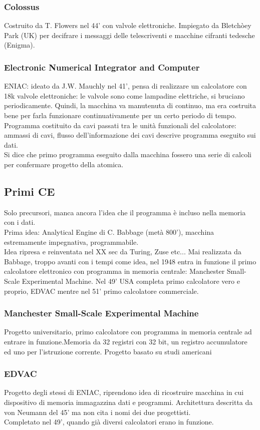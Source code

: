 \documentclass[12pt, oneside]{extbook}
\begin{document}
\subsubsection{Colossus}
Costruito da T. Flowers nel 44' con valvole elettroniche. Impiegato da Bletchòey Park (UK) per decifrare i messaggi delle telescriventi e macchine cifranti tedesche (Enigma).
\subsubsection{Electronic Numerical Integrator and Computer}
ENIAC: ideato da J.W. Mauchly nel 41', pensa di realizzare un calcolatore con 18k valvole elettroniche: le valvole sono come lampadine elettriche, si bruciano periodicamente. Quindi, la macchina va manutenuta di continuo, ma era costruita bene per farla funzionare continuativamente per un certo periodo di tempo. Programma costituito da cavi passati tra le unità funzionali del calcolatore: ammassi di cavi, flusso dell'informazione dei cavi descrive programma eseguito sui dati.\\ Si dice che primo programma eseguito dalla macchina fossero una serie di calcoli per confermare progetto della atomica.
\subsection{Primi CE}
Solo precursori, manca ancora l'idea che il programma è incluso nella memoria con i dati.\\ Prima idea: Analytical Engine di C. Babbage (metà 800'), macchina estremamente impegnativa, programmabile. \\ Idea ripresa e reinventata nel XX sec da Turing, Zuse etc... Mai realizzata da Babbage, troppo avanti con i tempi come idea, nel 1948 entra in funzione il primo calcolatore elettronico con programma in memoria centrale: Manchester Small-Scale Experimental Machine. Nel 49' USA completa primo calcolatore vero e proprio, EDVAC mentre nel 51' primo calcolatore commerciale.
\subsubsection{Manchester Small-Scale Experimental Machine}
Progetto universitario, primo calcolatore con programma in memoria centrale ad entrare in funzione.Memoria da 32 registri con 32 bit, un registro accumulatore ed uno per l'istruzione corrente. Progetto basato su studi americani
\subsubsection{EDVAC}
Progetto degli stessi di ENIAC, riprendono idea di ricostruire macchina in cui dispositivo di memoria immagazzina dati e programmi. Architettura descritta da von Neumann del 45' ma non cita i nomi dei due progettisti.\\ Completato nel 49', quando già diversi calcolatori erano in funzione.
\end{document}
